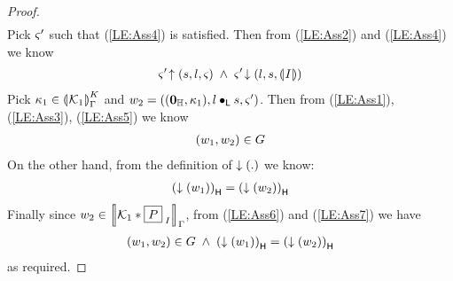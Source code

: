 \begin{lemma}[]
\begin{proof}
\begin{align}
\end{align}
%
Pick $\amod{}'$ such that (\ref{LE:Ass4}) is satisfied. Then from (\ref{LE:Ass2}) and (\ref{LE:Ass4}) we know
%
\begin{align}
	\expandsAM{\amod{}'}{s}{l}{\amod{}} \;\land\; \extendsAM{\amod{}'}{l}{s}{\intermediateSemI{I}} \label{LE:Ass5}
\end{align}
%
Pick $\ca{1} \in \semK[\lenv]{\capAss{1}}$ and $w_2 = \left( (\unitH, \ca{1}), l \composeL s, \amod{}'\right)$. Then from (\ref{LE:Ass1}), (\ref{LE:Ass3}), (\ref{LE:Ass5}) we know
%
\begin{align}
	(w_1, w_2) \in \guarantee \label{LE:Ass6}
\end{align}
%
On the other hand, from the definition of $\collapseW{.}$ we know:
\begin{align}
	\heapPart{\left(\collapseW{w_1}\right)} = \heapPart{\left(\collapseW{w_2}\right)} \label{LE:Ass7}
\end{align}
%
Finally since $w_2 \in \sem[\lenv]{\capAss{1} * \shared{P}{I}}$, from (\ref{LE:Ass6}) and (\ref{LE:Ass7}) we have
%
\begin{align}
	(w_1, w_2) \in \guarantee \;\land\; \heapPart{\left(\collapseW{w_1}\right)} = \heapPart{\left(\collapseW{w_2}\right)}
\end{align}
%
as required.
\end{proof}
\end{lemma}
%
%

